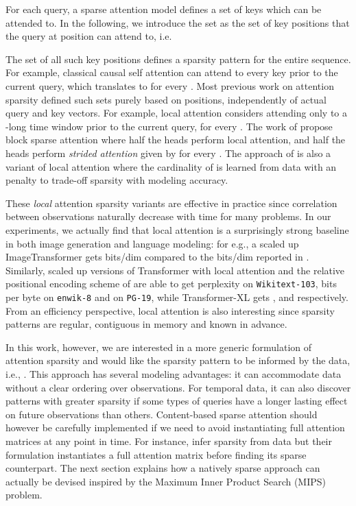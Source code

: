 \documentclass[a4paper]{article}
\begin{document}
For each query, a sparse attention model defines a set of keys which can be attended to.
In the following, we introduce the set  as the set of key positions that the query at 
position  can attend to, i.e.

The set of all such key positions defines a sparsity pattern  for the entire sequence.
For example, classical causal self attention can attend to every key prior to the current
query, which translates to  for every .
Most previous work on attention sparsity defined such sets purely based on positions, 
independently of actual query and key vectors. For example, local attention \citep{luong2015effective} considers attending only to a -long time window 
prior to the current query, 
 for every . 
The work of \citet{child2019generating} propose block
sparse attention where half the heads perform local attention, and half the heads perform \emph{strided attention} given by 
for every . 
The approach of \citet{sukhbaatar2019adaptive} is also a variant of local attention where the 
cardinality of  is learned from data with an  penalty to trade-off 
sparsity with modeling accuracy.

These \emph{local} attention sparsity variants are effective in practice since
correlation between observations naturally decrease with time for many problems.
In our experiments, we actually find that local attention is a surprisingly 
strong baseline in both image generation and language modeling: for e.g., a 
scaled up ImageTransformer \citep{parmar2018image}  gets  bits/dim 
compared to the  bits/dim reported in \citet{child2019generating}.
Similarly, scaled up versions of Transformer with local attention and the relative
positional encoding scheme of \citet{shaw2018self} are able to get  perplexity on 
\texttt{Wikitext-103},  bits per byte on \texttt{enwik-8} and  on \texttt{PG-19},
while Transformer-XL \citep{dai2019transformer} gets ,  and  respectively. 
From an efficiency perspective, local attention is
also interesting since sparsity patterns are regular, contiguous in memory and 
known in advance.

In this work, however, we are interested in a more generic formulation of attention
sparsity and would like the sparsity pattern to be informed by the data, 
i.e., . 
This approach has several modeling advantages: it can accommodate data without 
a clear ordering over observations. For temporal data, it can also discover 
patterns with greater sparsity if some types of queries have a longer lasting 
effect on future observations than others.
Content-based sparse attention should however be carefully implemented if we
need to avoid instantiating full attention matrices at any point in time.
For instance, \citet{correia2019adaptively} infer sparsity from data but their 
formulation instantiates a full attention matrix before finding its sparse counterpart.
The next section explains how a natively sparse approach can actually be devised
inspired by the Maximum Inner Product Search (MIPS) problem.
\end{document}
